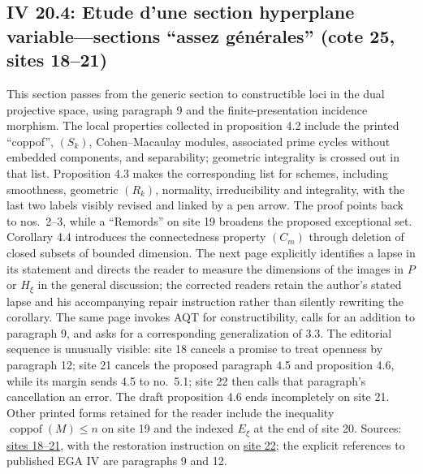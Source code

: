 \subsection*{IV 20.4: Etude d'une section hyperplane variable---sections ``assez générales'' (cote 25, sites 18--21)}
This section passes from the generic section to constructible loci in the dual projective space, using paragraph 9 and the finite-presentation incidence morphism. The local properties collected in proposition 4.2 include the printed ``coppof'', $(S_k)$, Cohen--Macaulay modules, associated prime cycles without embedded components, and separability; geometric integrality is crossed out in that list. Proposition 4.3 makes the corresponding list for schemes, including smoothness, geometric $(R_k)$, normality, irreducibility and integrality, with the last two labels visibly revised and linked by a pen arrow. The proof points back to nos.\ 2--3, while a ``Remords'' on site 19 broadens the proposed exceptional set. Corollary 4.4 introduces the connectedness property $(C_m)$ through deletion of closed subsets of bounded dimension. The next page explicitly identifies a lapse in its statement and directs the reader to measure the dimensions of the images in $P$ or $H_\xi$ in the general discussion; the corrected readers retain the author's stated lapse and his accompanying repair instruction rather than silently rewriting the corollary. The same page invokes AQT for constructibility, calls for an addition to paragraph 9, and asks for a corresponding generalization of 3.3. The editorial sequence is unusually visible: site 18 cancels a promise to treat openness by paragraph 12; site 21 cancels the proposed paragraph 4.5 and proposition 4.6, while its margin sends 4.5 to no.\ 5.1; site 22 then calls that paragraph's cancellation an error. The draft proposition 4.6 ends incompletely on site 21. Other printed forms retained for the reader include the inequality $\operatorname{coppof}(M)\leq n$ on site 19 and the indexed $E_\xi$ at the end of site 20. Sources: \href{https://grothendieck.umontpellier.fr/web/viewer.html?file=../25.pdf\#page=19}{sites 18--21}, with the restoration instruction on \href{https://grothendieck.umontpellier.fr/web/viewer.html?file=../25.pdf\#page=23}{site 22}; the explicit references to published EGA IV are paragraphs 9 and 12.
